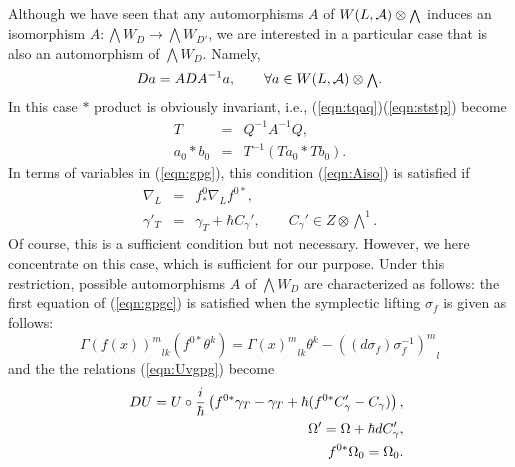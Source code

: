 \documentclass[10pt,a4paper]{article}
\def\h{\hbar}
\begin{document}
Although we have seen that any automorphisms $A$ of $W(L,{\cal A})\otimes{\scriptstyle \bigwedge}$ induces an isomorphism $A:{\scriptstyle \bigwedge} W_D\rightarrow{\scriptstyle \bigwedge} W_{D'}$, we are interested in a particular case that is also an automorphism of ${\scriptstyle \bigwedge} W_D$. Namely,
\begin{equation}
\label{eqn:Aiso}
Da=ADA^{-1}a,\qquad \forall a\in W(L,{\cal A})\otimes {\scriptstyle \bigwedge}.
\end{equation}
In this case $*$ product is obviously invariant, i.e., (\ref{eqn:tqaq})(\ref{eqn:ststp}) become
\begin{eqnarray}
T&=&Q^{-1}A^{-1}Q,\nonumber\\
a_0*b_0&=&T^{-1}(Ta_0*Tb_0).
\end{eqnarray}
In terms of variables in (\ref{eqn:gpg}), this condition (\ref{eqn:Aiso}) is satisfied if
\begin{eqnarray}
\label{eqn:gpgc}
\nabla_L&=&f^0_*\nabla_Lf^{0*},\nonumber\\
\gamma'_T&=&\gamma_T+\h C_\gamma',\qquad  C_\gamma'\in Z\otimes {\scriptstyle \bigwedge}^1.
\end{eqnarray}
Of course, this is a sufficient condition but not necessary. However, we here concentrate on this case, which is sufficient for our purpose. Under this restriction, possible automorphisms $A$ of ${\scriptstyle \bigwedge} W_D$ are characterized as follows: the first equation of (\ref{eqn:gpgc}) is satisfied when the symplectic lifting $\sigma_f$ is given as follows:
\begin{equation}
\label{eqn:sigf}
{\Gamma(f(x))^m}_{lk}(f^{0*}\theta^k)={\Gamma(x)^m}_{lk}\theta^k-{\left((d{\sigma_f})\sigma^{-1}_f\right)^m}_l
\end{equation}
and the the relations (\ref{eqn:Uvgpg}) become
\begin{eqnarray}
\label{eqn:Uvgpa}
&&DU=U\circ {i\over\h}\left(f^{0*}\gamma_T-\gamma_T+\h(f^{0*}C_\gamma'-C_\gamma)\right),\nonumber\\
&&\Omega'=\Omega+\h dC_\gamma',\nonumber\\
&&f^{0*}\Omega_0=\Omega_0. 
\end{eqnarray} 
\end{document}
